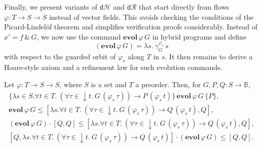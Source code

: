 \documentclass[envcountsame,envcountsect]{llncs}
\newcommand{\dH}{\mathsf{d}\mathcal{H}}
\newcommand{\dR}{\mathsf{d}\mathcal{R}}
\newcommand{\flow}{\varphi}
\newcommand{\bools}{\mathbb{B}}
\begin{document}
Finally, we present variants of $\dH$ and $\dR$ that start directly
from flows $\flow:T\to S\to S$ instead of vector fields.  This avoids
checking the conditions of the Picard-Lindel\"of theorem and
simplifies verification proofs considerably.  Instead of
$x'=f\, \&\, G$, we now use the command
$\mathbf{evol}\, \flow\, G$ in hybrid programs and define
\begin{equation*}
  (\mathbf{evol}\, \flow\, G) = \lambda s.\ \gamma^{\flow_s}_G\, s
\end{equation*}
with respect to the guarded orbit of $\flow_s$ along $T$ in $s$. It
then remains to derive a Hoare-style axiom and a refinement law
for such evolution commands. 
\begin{lemma}\label{P:hr-evlfl}
  Let $\flow:T\to S\to S$, where $S$ is a set and $T$ a
  preorder. Then, for $G,P,Q:S\to \bools$,
\begin{gather*}
\{\lambda s\in S.\forall t\in T.\ (\forall
\tau\in {\downarrow}t.\ G\, (\flow_s\, \tau)) \rightarrow P\,
(\flow_s\, t)\}\, \mathbf{evol}\, \flow\, G\, \{P\}, \label{eq:h-evlfl}\tag{h-evlfl}\\
\mathbf{evol}\, \flow\, G \le [\lambda s.\forall t\in T.\ (\forall
\tau\in {\downarrow}t.\ G\, (\flow_s\, \tau))\to Q\, (\flow_s\, t),Q],\label{eq:r-evlf}\tag{r-evlf}\\
(\mathbf{evol}\, \flow\, G) \cdot \left[Q,Q\right] \le [\lambda s. \forall t\in T.\ (\forall
\tau\in {\downarrow}t.\ G\, (\flow_s\, \tau))\to Q\, (\flow_s\, t),Q],\label{eq:r-evlfl}\tag{r-evlfl}\\
\left[Q,\lambda s. \forall t\in T.\ (\forall
\tau\in {\downarrow}t.\ G\, (\flow_s\, \tau))\to Q\, (\flow_s\, t)\right]\cdot (\mathbf{evol}\, \flow\, G) \le [Q,Q].\label{eq:r-evlfr}\tag{r-evlfr}
\end{gather*}
\end{lemma}
\end{document}
